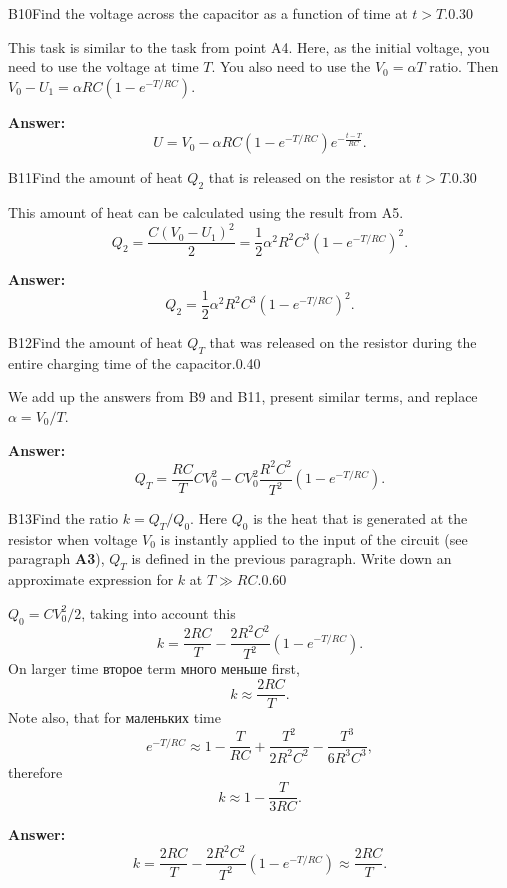 \documentclass[11pt,a4paper]{article}
\begin{document}
\begin{solcard}{B10}{Find the voltage across the capacitor as a function of time at $t > T$.}{0.30}

This task is similar to the task from point A4. Here, as the initial voltage, you need to use the voltage at time $T$. You also need to use the $V_0 = \alpha T$ ratio. Then $V_0 - U_1 = \alpha RC \left(1 - e^{-T/RC} \right)$.

\par\smallskip\noindent\textbf{Answer:} $$ U = V_0 - \alpha RC \left(1 - e^{-T/RC} \right) e^{- \frac{t-T}{RC}}. $$
\end{solcard}

\begin{solcard}{B11}{Find the amount of heat $Q_2$ that is released on the resistor at $t > T$.}{0.30}

This amount of heat can be calculated using the result from A5. $$ Q_2 = \frac{C (V_0 - U_1)^2}{2}= \frac{1}{2}\alpha^2 R^2 C^3  \left(1 - e^{-T/RC} \right)^2. $$

\par\smallskip\noindent\textbf{Answer:} $$ Q _2= \frac{1}{2}\alpha^2 R^2 C^3  \left(1 - e^{-T/RC} \right)^2. $$
\end{solcard}

\begin{solcard}{B12}{Find the amount of heat $Q_T$ that was released on the resistor during the entire charging time of the capacitor.}{0.40}

We add up the answers from B9 and B11, present similar terms, and replace $\alpha = V_0/T$.

\par\smallskip\noindent\textbf{Answer:} $$ Q_T = \frac{RC}{T} CV_0^2 -  CV_0^2 \frac{R^2 C^2}{T^2}  \left(1 - e^{-T/RC} \right). $$
\end{solcard}

\begin{solcard}{B13}{Find the ratio $k = Q_T/Q_0$. Here $Q_0$ is the heat that is generated at the resistor when voltage $V_0$ is instantly applied to the input of the circuit (see paragraph \textbf{A3}), $Q_T$ is defined in the previous paragraph. Write down an approximate expression for $k$ at $T \gg RC$.}{0.60}

$Q_0 = CV_0^2/2$, taking into account this $$ k = \frac{2RC}{T} - \frac{2 R^2 C^2} {T^2} \left(1 - e^{-T/RC} \right). $$ On larger time второе term много меньше first, $$ k \approx  \frac{2RC}{T}. $$ Note also, that for маленьких time $$ e^{-T/RC} \approx 1 - \frac{T}{RC} + \frac{T^2}{2 R^2 C^2} -\frac{T^3}{6 R^3 C^3}, $$ therefore $$ k \approx 1 - \frac{T}{3RC}. $$

\par\smallskip\noindent\textbf{Answer:} $$ k = \frac{2RC}{T} - \frac{2 R^2 C^2} {T^2} \left(1 - e^{-T/RC} \right) \approx  \frac{2RC}{T}. $$
\end{solcard}
\end{document}
